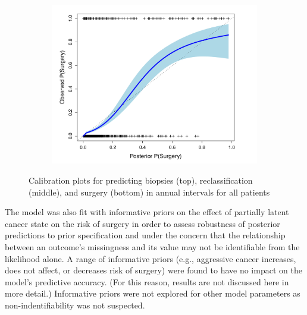 \documentclass[12pt, letterpaper]{article}
\begin{document}
\begin{figure}
\begin{center}
\begin{subfigure}[b]{0.5\textwidth}
\end{subfigure}
\begin{subfigure}[b]{0.5\textwidth}
\includegraphics[width=\textwidth]{pred-vs-obs-rrp.pdf}
\end{subfigure}
\caption{Calibration plots for predicting biopsies (top), reclassification (middle), and surgery (bottom) in annual intervals for all patients} 
\label{fig:calibration-all-bx}
\end{center}
\end{figure}


The model was also fit with informative priors on the effect of partially latent cancer state on the risk of surgery in order to assess robustness of posterior predictions to prior specification and under the concern that the relationship between an outcome's missingness and its value may not be identifiable from the likelihood alone. A range of informative priors (e.g., aggressive cancer increases, does not affect, or decreases risk of surgery) were found to have no impact on the model's predictive accuracy. (For this reason, results are not discussed here in more detail.) Informative priors were not explored for other model parameters as non-indentifiability was not suspected. %


\end{document}
